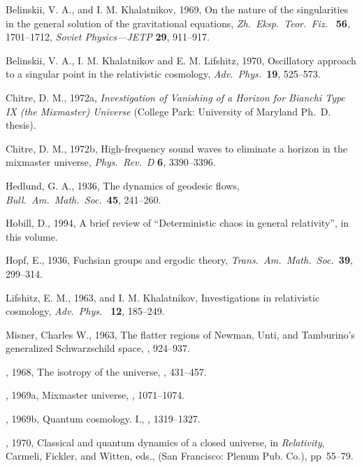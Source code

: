 \begin{references}

\bibitem{}Belinskii, V. A., and I. M. Khalatnikov, 1969, On the nature
of the singularities in the general solution of the gravitational
equations, {\em Zh.\ Eksp.\ Teor.\ Fiz.\ } {\bf 56}, 1701--1712,
{\em Soviet Physics---JETP} {\bf 29}, 911--917.

\bibitem{}Belinskii, V. A., I. M. Khalatnikov and E. M. Lifshitz, 1970,
Oscillatory approach to a singular point in the relativistic
cosmology, {\em Adv.\ Phys.\ }{\bf 19}, 525--573.

\bibitem{}Chitre, D. M., 1972a, {\em Investigation of Vanishing of a
Horizon for Bianchi Type IX (the Mixmaster) Universe} (College Park:
University of Maryland Ph.\ D. thesis).

\bibitem{}Chitre, D. M., 1972b, High-frequency sound waves to
eliminate a horizon in the mixmaster universe, {\em Phys.\ Rev.\ D\/}
{\bf 6}, 3390--3396.

\bibitem{}Hedlund, G. A., 1936, The dynamics of geodesic flows,
{\em Bull.\ Am.\ Math.\ Soc.\ }{\bf 45}, 241--260.

\bibitem{}Hobill, D., 1994, A brief review of ``Deterministic chaos
in general relativity'', in this volume.

\bibitem{}Hopf, E., 1936, Fuchsian groups and ergodic theory,
{\em Trans.\ Am.\ Math.\ Soc.\ }{\bf 39}, 299--314.

\bibitem{}Lifshitz, E. M., 1963, and I. M. Khalatnikov,
Investigations in relativistic cosmology, {\em Adv.\ Phys.\ }
{\bf 12}, 185--249.

\bibitem{}Misner, Charles W., 1963, The flatter regions of Newman,
Unti, and Tamburino's generalized Schwarzschild space,
, 924--937.

\bibitem{}\dash, 1968, The isotropy of the universe,
, 431--457.

\bibitem{}\dash, 1969a, Mixmaster universe,
, 1071--1074.

\bibitem{}\dash, 1969b, Quantum cosmology. I.,
, 1319--1327.

\bibitem{}\dash, 1970, Classical and quantum dynamics of a closed
universe, in {\em Relativity}, Carmeli, Fickler, and Witten, eds.,
(San Francisco: Plenum Pub. Co.), pp~55--79.


\end{references}
